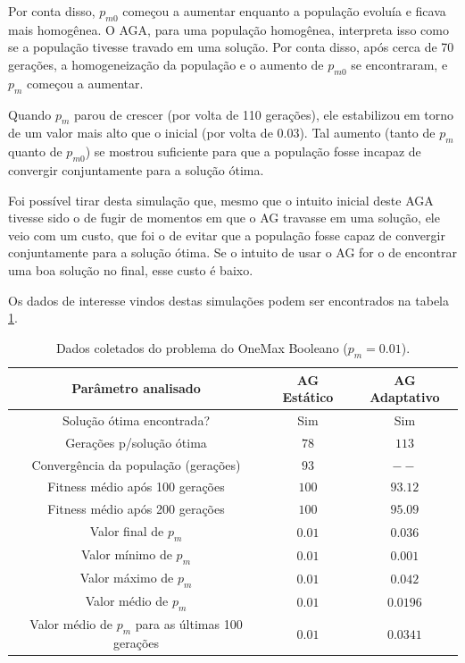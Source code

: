 Por conta disso, $p_{m0}$ começou a aumentar enquanto a população evoluía e ficava mais homogênea. O AGA, para uma população homogênea, interpreta isso como se a população tivesse travado em uma solução. Por conta disso, após cerca de 70 gerações, a homogeneização da população e o aumento de $p_{m0}$ se encontraram, e $p_m$ começou a aumentar.

Quando $p_m$ parou de crescer (por volta de 110 gerações), ele estabilizou em torno de um valor mais alto que o inicial (por volta de 0.03). Tal aumento (tanto de $p_m$ quanto de $p_{m0}$) se mostrou suficiente para que a população fosse incapaz de convergir conjuntamente para a solução ótima.

Foi possível tirar desta simulação que, mesmo que o intuito inicial deste AGA tivesse sido o de fugir de momentos em que o AG travasse em uma solução, ele veio com um custo, que foi o de evitar que a população fosse capaz de convergir conjuntamente para a solução ótima. Se o intuito de usar o AG for o de encontrar uma boa solução no final, esse custo é baixo.

Os dados de interesse vindos destas simulações podem ser encontrados na tabela \ref{tab:onemax_boolean}.

\begin{table}
\caption{Dados coletados do problema do OneMax Booleano ($p_m = 0.01$).}
\label{tab:onemax_boolean}

\center
\begin{tabular}{ccc}
	\hline
	Parâmetro analisado 								& AG Estático	& AG Adaptativo   \\
	\hline
	Solução ótima encontrada?							& Sim			& Sim		\\
	Gerações p/solução ótima							& $78$			& $113$		\\
	Convergência da população (gerações)				& $93$			& $--$		\\
	Fitness médio após 100 gerações						& $100$			& $93.12$	\\
	Fitness médio após 200 gerações 					& $100$			& $95.09$	\\
	Valor final de $p_m$								& $0.01$ 		& $0.036$	\\
	Valor mínimo de $p_m$								& $0.01$		& $0.001$	\\
	Valor máximo de $p_m$								& $0.01$		& $0.042$	\\
	Valor médio de $p_m$								& $0.01$		& $0.0196$	\\
	Valor médio de $p_m$ para as últimas 100 gerações	& $0.01$		& $0.0341$	\\
	\hline
\end{tabular}
\end{table}

